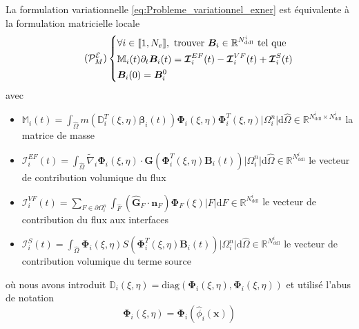 \documentclass[11pt, a4paper, oneside]{report}
\begin{document}
La formulation variationnelle \eqref{eq:Probleme_variationnel_exner} est équivalente à la formulation matricielle locale
\begin{equation} \tag{$\mathcal{P}_M^\mathcal{E}$} \label{eq:Probleme_matriciel_exner}
    \left \{
    \begin{aligned}
        & \forall i \in \llbracket 1, N_e \rrbracket, \text{ trouver } \bm{B}_i \in \mathbb{R}^{N_\text{ddl}^i} \text{ tel que } \\
        & \mathbb{M}_i(t) \partial_t \bm{B}_i(t) = \bm{\mathcal{I}}_i^{EF}(t) - \bm{\mathcal{I}}_i^{VF}(t) + \bm{\mathcal{I}}_i^S(t) \\
        & \bm{B}_i(0) = \bm{B}_i^0
    \end{aligned}
    \right .
\end{equation}
avec
\begin{itemize}
    \item $\displaystyle \mathbb{M}_i(t) = \int_{\widehat{\Omega}} m \left( \mathbb{D}_i^T(\xi, \eta) \bm{\beta}_i(t) \right) \bm{\Phi}_i(\xi, \eta) \bm{\Phi}_i^T(\xi, \eta) \lvert \Omega_i^n \rvert \text{d}\widehat{\Omega} \in \mathbb{R}^{N_\text{ddl}^i \times N_\text{ddl}^i}$ la matrice de masse
    \item $\displaystyle \bm{\mathcal{I}}_i^{EF}(t) = \int_{\widehat{\Omega}} \widetilde{\nabla}_i \bm{\Phi}_i(\xi, \eta) \cdot \bm{G} \left( \bm{\Phi}_i^T(\xi, \eta) \bm{B}_i(t) \right) \lvert \Omega_i^n \rvert \text{d}\widehat{\Omega} \in \mathbb{R}^{N_\text{ddl}^i}$ le vecteur de contribution volumique du flux
    \item $\displaystyle \bm{\mathcal{I}}_i^{VF}(t) = \sum_{F \in \partial \Omega_i^n} \int_{\widehat{F}} \left( \bm{\widehat{G}}_F \cdot \bm{n}_F \right) \bm{\Phi}_F(\xi) \lvert F \rvert \text{d}\widehat{F} \in \mathbb{R}^{N_\text{ddl}^i}$ le vecteur de contribution du flux aux interfaces
    \item $\displaystyle \bm{\mathcal{I}}_i^S(t) = \int_{\widehat{\Omega}} \bm{\Phi}_i(\xi, \eta) S \left( \bm{\Phi}_i^T(\xi, \eta) \bm{B}_i(t) \right) \lvert \Omega_i^n \rvert \text{d}\widehat{\Omega} \in \mathbb{R}^{N_\text{ddl}^i}$ le vecteur de contribution volumique du terme source
\end{itemize}
où nous avons introduit $\mathbb{D}_i (\xi, \eta) = \text{diag} \left( \bm{\Phi}_i(\xi, \eta), \bm{\Phi}_i(\xi, \eta) \right)$ et utilisé l'abus de notation
\begin{equation}
    \bm{\Phi}_i(\xi, \eta) = \bm{\Phi}_i(\widehat{\phi}_i(\bm{x}))
\end{equation}
\end{document}

